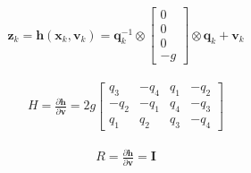 \documentclass[11pt]{article}
\begin{document}
\begin{align*}
\bm{z}_k = \bm{h}(\bm{x}_k, \bm{v}_k) = \bm{q}_k^{-1} \otimes \begin{bmatrix}
0\\ 0\\ 0\\ -g \end{bmatrix} \otimes \bm{q}_k + \bm{v}_k
\end{align*}


\begin{align*}
H = \frac{\partial \bm{h} }{\partial \bm{v}} = 2 g \begin{bmatrix}
q_3 &   -q_4 &   q_1  & -q_2  \\
-q_2 &   -q_1 &   q_4  & -q_3  \\
q_1 &   q_2 &   q_3  & -q_4  
\end{bmatrix}
\end{align*}

\begin{align*}
R = \frac{\partial \bm{h} }{\partial \bm{v}} = \bm{I}
\end{align*}

\end{document}
